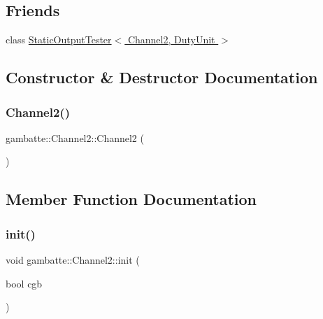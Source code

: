 \subsection*{Friends}
\begin{DoxyCompactItemize}
\item 
class \hyperlink{classgambatte_1_1Channel2_a0e4bb4e43d3269e56a11539381699ad0}{Static\+Output\+Tester$<$ Channel2, Duty\+Unit $>$}
\end{DoxyCompactItemize}


\subsection{Constructor \& Destructor Documentation}
\mbox{\label{classgambatte_1_1Channel2_a9439edf10073a5eac15556cd503d0182}} 
\subsubsection{\texorpdfstring{Channel2()}{Channel2()}}
{\footnotesize\ttfamily gambatte\+::\+Channel2\+::\+Channel2 (\begin{DoxyParamCaption}{ }\end{DoxyParamCaption})}



\subsection{Member Function Documentation}
\mbox{\label{classgambatte_1_1Channel2_a10af65cdd99207c851a00ce7b15245ab}} 
\subsubsection{\texorpdfstring{init()}{init()}}
{\footnotesize\ttfamily void gambatte\+::\+Channel2\+::init (\begin{DoxyParamCaption}\item[{bool}]{cgb }\end{DoxyParamCaption})}

\mbox{\label{classgambatte_1_1Channel2_a866214a53810c25c810ca09855aa4e7c}} 
